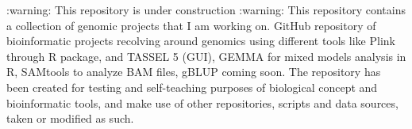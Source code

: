 \markdownRendererDocumentBegin
\markdownRendererSectionBegin
{}\markdownRendererInterblockSeparator
{}\markdownRendererBlockQuoteBegin
:warning: This repository is under construction :warning:
\markdownRendererBlockQuoteEnd \markdownRendererInterblockSeparator
{}This repository contains a collection of genomic projects that I am working on. GitHub repository of bioinformatic projects recolving around genomics using different tools like Plink through  R package,  and TASSEL 5 (GUI), GEMMA for mixed models analysis in R, SAMtools to analyze BAM files, gBLUP coming soon.\markdownRendererInterblockSeparator
{}The repository has been created for testing and self-teaching purposes of biological concept and bioinformatic tools, and make use of other repositories, scripts and data sources, taken or modified as such.\markdownRendererInterblockSeparator
{}\markdownRendererSectionBegin
{}\markdownRendererInterblockSeparator
{}\markdownRendererUlBeginTight
\markdownRendererUlItem {}\markdownRendererUlItemEnd 
\markdownRendererUlItem {}\markdownRendererUlItemEnd 
\markdownRendererUlItem {}\markdownRendererUlItemEnd 
\markdownRendererUlItem {}\markdownRendererUlItemEnd 
\markdownRendererUlItem {}\markdownRendererUlItemEnd 
\markdownRendererUlItem {}\markdownRendererInterblockSeparator
{}\markdownRendererUlBeginTight
\markdownRendererUlItem {}\markdownRendererUlItemEnd 
\markdownRendererUlItem {}\markdownRendererUlItemEnd 
\markdownRendererUlItem {}\markdownRendererUlItemEnd 
